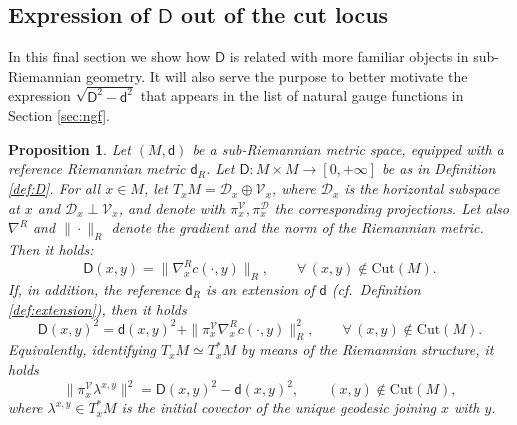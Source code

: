 \documentclass[11pt,a4paper]{article}
\theoremstyle{plain}
\newtheorem{proposition}[theorem]{Proposition}
\theoremstyle{definition}
\theoremstyle{remark}
\numberwithin{equation}{section}
\newcommand{\ver}{\mathscr{V}}
\newcommand{\hor}{\mathscr{D}} %
\newcommand{\Cut}{\mathrm{Cut}}
\newcommand{\sfd}{\mathsf d}
\newcommand{\sfD}{\mathsf D}
\begin{document}
\subsection{Expression of \texorpdfstring{$\sfD$}{D} out of the cut locus}\label{sec:Doutofcut}

In this final section we show how $\sfD$ is related with more familiar objects in sub-Riemannian geometry. It will also serve the purpose to better motivate the expression $\sqrt{\sfD^2-\sfd^2}$ that appears in the list of natural gauge functions in Section \ref{sec:ngf}.


\begin{proposition}\label{prop:naturalobject}
Let $(M,\sfd)$ be a sub-Riemannian metric space, equipped with a reference Riemannian metric $\sfd_R$. Let $\sfD:M\times M\to [0,+\infty]$ be as in Definition \ref{def:D}. For all $x\in M$, let $T_x M = \hor_x \oplus \ver_x$, where $\hor_x$ is the horizontal subspace at $x$ and $\hor_x \perp \ver_x$, and denote with $\pi_x^\ver,\pi_x^\hor$ the corresponding projections. Let also $\nabla^R$ and $\|\cdot\|_R$ denote the gradient and the norm of the Riemannian metric. Then it holds:
\begin{equation}\label{eq:naturalobject1}
\sfD(x,y) = \|\nabla_x^R c(\cdot,y)\|_R,\qquad \forall\, (x,y)\notin\Cut(M).
\end{equation}
If, in addition, the reference $\sfd_R$ is an extension of $\sfd$ (cf.\ Definition \ref{def:extension}), then it holds
\begin{equation}\label{eq:naturalobject2}
\sfD(x,y)^2 = \sfd(x,y)^2 + \|\pi^\ver_x \nabla_x^R c(\cdot,y)\|_R^2, \qquad \forall\, (x,y)\notin\Cut(M).
\end{equation}
Equivalently, identifying $T_xM \simeq T_x^*M$ by means of the Riemannian structure, it holds
\begin{equation}\label{eq:naturalobject3}
\|\pi_x^\ver \lambda^{x,y}\|^2 = \sfD(x,y)^2 - \sfd(x,y)^2, \qquad (x,y)\notin\Cut(M),
\end{equation}
where $\lambda^{x,y} \in T_x^*M$ is the initial covector of the unique geodesic joining $x$ with $y$.
\end{proposition}
\end{document}
